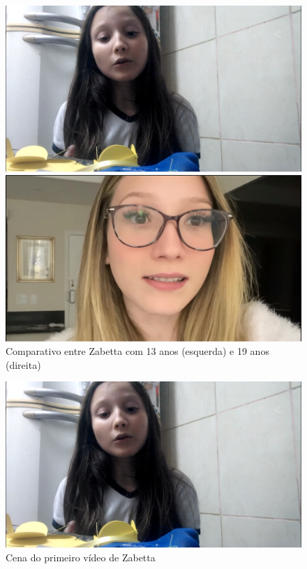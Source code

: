 \begin{figure}[h!]
    \centering

    \begin{minipage}[b]{0.45\linewidth}
        \includegraphics[width=0.8\linewidth]{fig/Zabetta-13-anos-primeiro-video}
    \end{minipage}%
    \quad
    \begin{minipage}[b]{0.45\linewidth}
        \includegraphics[width=0.8\linewidth]{fig/Zabetta-18-anos-facul}
    \end{minipage}%

    \quad

    \caption{Comparativo entre Zabetta com 13 anos (esquerda) e 19 anos (direita)}
    \label{fig:zabeta-comparativo}

\end{figure}



\begin{figure}[h!]
    \centering
    \includegraphics[width=0.7\linewidth]{fig/Zabetta-13-anos-primeiro-video}
    \caption{Cena do primeiro vídeo de Zabetta}
    \label{fig:zabetta-13-anos-primeiro-video}
\end{figure}

